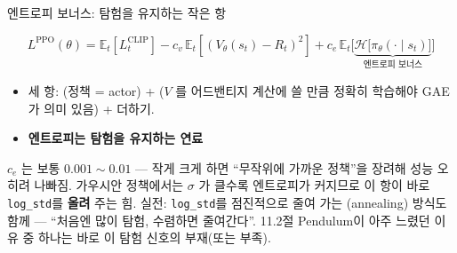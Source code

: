 \begin{frame}{엔트로피 보너스: 탐험을 유지하는 작은 항}
  
  \[
  L^{\mathrm{PPO}}(\theta) = \mathbb{E}_t[L^{\mathrm{CLIP}}_t]
  - c_v\,\mathbb{E}_t[(V_\theta(s_t)-R_t)^2]
  + c_e\,\mathbb{E}_t\Big[\underbrace{
  \mathcal{H}\big[\pi_\theta(\cdot\mid s_t)\big]}_{\text{엔트로피
  보너스}}\Big]
  \]
  \begin{itemize}
    \item 세 항: (정책 = actor) +
      ($V$ 를 어드밴티지 계산에 쓸 만큼
      정확히 학습해야 GAE가 의미 있음) + 
      더하기.
    
    \item \textbf{엔트로피는 탐험을 유지하는 연료}
  \end{itemize}
  \begin{block}{$c_e$ 는 보통 $0.001\sim0.01$ — 작게}
    크게 하면 ``무작위에 가까운 정책''을 장려해 성능 오히려
    나빠짐. 가우시안 정책에서는 $\sigma$ 가 클수록 엔트로피가
    커지므로 이 항이 바로 \texttt{log\_std}를 \textbf{올려}
    주는 힘. 실전: \texttt{log\_std}를 점진적으로 줄여 가는
    (annealing) 방식도 함께 — ``처음엔 많이 탐험, 수렴하면
    줄여간다''. 11.2절 Pendulum이 아주 느렸던 이유 중 하나는
    바로 이 탐험 신호의 부재(또는 부족).
  \end{block}

\end{frame}
